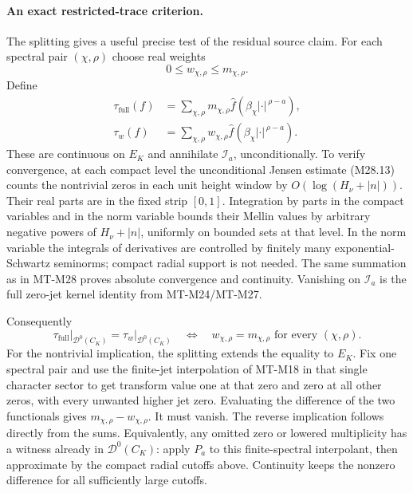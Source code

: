 \paragraph{An exact restricted-trace criterion.}
The splitting gives a useful precise
test of the residual source claim.
For each spectral pair \((\chi,\rho)\)
choose real weights
\[
                   0\le w_{\chi,\rho}\le m_{\chi,\rho}.
 \]
Define
\[
 \begin{split}
 \tau_{\mathrm{full}}(f)
    &=\sum_{\chi,\rho}m_{\chi,\rho}
              \widehat f(\beta_\chi|\cdot|^{\,\rho-a}),\\
 \tau_w(f)
    &=\sum_{\chi,\rho}w_{\chi,\rho}
              \widehat f(\beta_\chi|\cdot|^{\,\rho-a}).
 \end{split}                                                    \tag{M30.13}
\]
These are continuous on \(E_K\) and
annihilate \(\mathcal I_a\),
unconditionally. To verify convergence,
at each compact level the unconditional
Jensen estimate (M28.13) counts
the nontrivial zeros in each unit
height window by
\(O(\log(H_\nu+|n|))\).
Their real parts are in the fixed
strip \([0,1]\). Integration by
parts in the compact variables
and in the norm variable bounds
their Mellin values by arbitrary
negative powers of \(H_\nu+|n|\),
uniformly on bounded sets at that
level. In the norm variable the
integrals of derivatives are
controlled by finitely many
exponential-Schwartz seminorms;
compact radial support is not
needed. The same summation as
in MT-M28 proves absolute
convergence and continuity.
Vanishing on \(\mathcal I_a\)
is the full zero-jet kernel
identity from MT-M24/MT-M27.

Consequently
\[
 \left.\tau_{\mathrm{full}}\right|_{\mathcal D^0(C_K)}
       =\left.\tau_w\right|_{\mathcal D^0(C_K)}
       \quad\Longleftrightarrow\quad
             w_{\chi,\rho}=m_{\chi,\rho}
                     \text{ for every }(\chi,\rho).           \tag{M30.14}
\]
For the nontrivial implication,
the splitting extends the equality
to \(E_K\). Fix one spectral
pair and use the finite-jet
interpolation of MT-M18 in
that single character sector
to get transform value one
at that zero and zero at
all other zeros, with every
unwanted higher jet zero.
Evaluating the difference of
the two functionals gives
\(m_{\chi,\rho}-w_{\chi,\rho}\).
It must vanish. The reverse
implication follows directly
from the sums.
Equivalently, any omitted
zero or lowered multiplicity
has a witness already in
\(\mathcal D^0(C_K)\):
apply \(P_a\) to this
finite-spectral interpolant,
then approximate by the
compact radial cutoffs above.
Continuity keeps the nonzero
difference for all sufficiently
large cutoffs.

